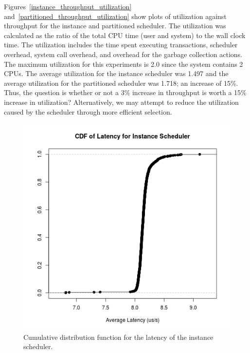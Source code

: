 Figures~\ref{instance_throughput_utilization} and~\ref{partitioned_throughput_utilization} show plots of utilization against throughput for the instance and partitioned scheduler.
The utilization was calculated as the ratio of the total CPU time (user and system) to the wall clock time.
The utilization includes the time spent executing transactions, scheduler overhead, system call overhead, and overhead for the garbage collection actions.
The maximum utilization for this experiments is 2.0 since the system contains 2 CPUs.
The average utilization for the instance scheduler was 1.497 and the average utilization for the partitioned scheduler was 1.718; an increase of 15\%.
Thus, the question is whether or not a 3\% increase in throughput is worth a 15\% increase in utilization?
Alternatively, we may attempt to reduce the utilization caused by the scheduler through more efficient selection.

\begin{figure}
\center
\includegraphics[width=\textwidth]{instance_latency_cdf.png}
\caption{Cumulative distribution function for the latency of the instance scheduler. \label{instance_latency}}
\end{figure}

